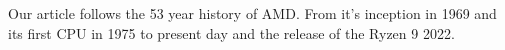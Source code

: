 \documentclass[../computer-history.tex]{subfiles}
\begin{document}
Our article follows the 53 year history of AMD. From it's inception in 1969 and its first CPU in 1975 to present day and the release of the Ryzen 9 2022.
\biblio
\end{document}
